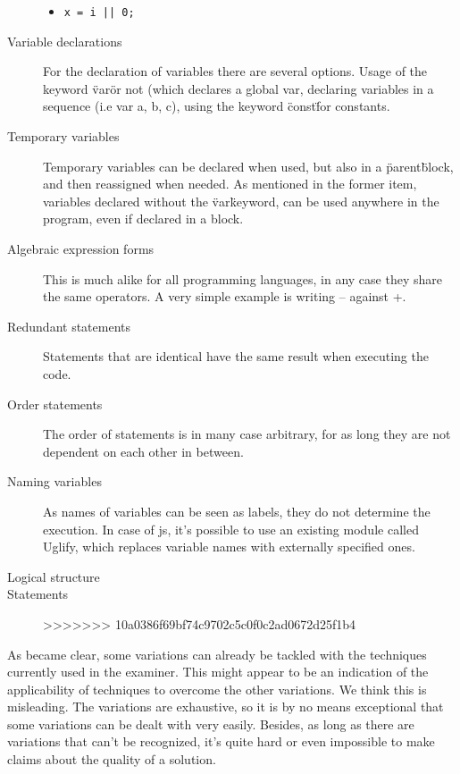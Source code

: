 \begin{description}
\begin{itemize}
    \item

\begin{lstlisting}
x = i || 0;
\end{lstlisting}

  \end{itemize}
  \item[Variable declarations] For the declaration of variables there are 
  several options. Usage of the keyword \"var\" or not (which declares a global 
  var, declaring variables in a sequence (i.e var a, b, c), using the keyword 
  \"const\" for constants.
  \item[Temporary variables] Temporary variables can be declared when used, but
  also in a \"parent\" block, and then reassigned when needed. As mentioned in
  the former item, variables declared without the \"var\" keyword, can be used
  anywhere in the program, even if declared in a block.
  \item[Algebraic expression forms] This is much alike for all programming
  languages, in any case they share the same operators. A very simple example is
  writing -- against +.
  \item[Redundant statements] Statements that are identical have the same result
  when executing the code.  
  \item[Order statements] The order of statements is in many case arbitrary, for
  as long they are not dependent on each other in between.
  \item[Naming variables] As names of variables can be seen as labels, they do
  not determine the execution. In case of \gls{js}, it's possible to use an
  existing module called Uglify, which replaces variable names with externally
  specified ones.
  \item[Logical structure] %
  \item[Statements]	%
>>>>>>> 10a0386f69bf74c9702c5c0f0c2ad0672d25f1b4
\end{description}


As became clear, some variations can already be tackled with the techniques
currently used in the \gls{examiner}. This might appear to be an indication of 
the applicability of techniques to overcome the other variations. We think this 
is misleading. The variations are exhaustive, so it is by no means exceptional 
that some variations can be dealt with very easily. Besides, as long as there are
variations that can't be recognized, it's quite hard or even impossible to make
claims about the quality of a \gls{solution}. 
	

